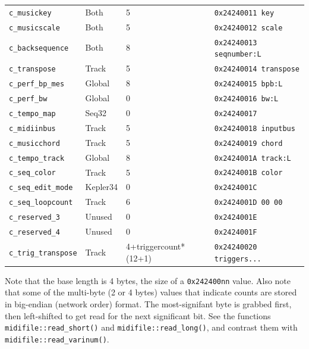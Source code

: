 \begin{table}[htb]
\begin{tabular}{l l l l}
         \texttt{c\_musickey}        & Both          & 5                 & \texttt{0x24240011 key} \\
         \texttt{c\_musicscale}      & Both          & 5                 & \texttt{0x24240012 scale} \\
         \texttt{c\_backsequence}    & Both          & 8                 & \texttt{0x24240013 seqnumber:L} \\
         \texttt{c\_transpose}       & Track         & 5                 & \texttt{0x24240014 transpose} \\
         \texttt{c\_perf\_bp\_mes}   & Global        & 8                 & \texttt{0x24240015 bpb:L} \\
         \texttt{c\_perf\_bw}        & Global        & 0                 & \texttt{0x24240016 bw:L} \\
         \texttt{c\_tempo\_map}      & Seq32         & 0                 & \texttt{0x24240017} \\
         \texttt{c\_midiinbus}       & Track         & 5                 & \texttt{0x24240018 inputbus} \\
         \texttt{c\_musicchord}      & Track         & 5                 & \texttt{0x24240019 chord} \\
         \texttt{c\_tempo\_track}    & Global        & 8                 & \texttt{0x2424001A track:L} \\
         \texttt{c\_seq\_color}      & Track         & 5                 & \texttt{0x2424001B color} \\
         \texttt{c\_seq\_edit\_mode} & Kepler34      & 0                 & \texttt{0x2424001C} \\
         \texttt{c\_seq\_loopcount}  & Track         & 6                 & \texttt{0x2424001D 00 00} \\
         \texttt{c\_reserved\_3}     & Unused        & 0                 & \texttt{0x2424001E} \\
         \texttt{c\_reserved\_4}     & Unused        & 0                 & \texttt{0x2424001F} \\
         \texttt{c\_trig\_transpose} & Track     & 4+triggercount*(12+1) & \texttt{0x24240020 triggers...} \\
      \end{tabular}
   \end{table}

   Note that the base length is 4 bytes, the size of a \texttt{0x242400nn}
   value.  Also note that some of the multi-byte (2 or 4 bytes) values that
   indicate counts are stored in big-endian (network order) format.  The
   most-signifant byte is grabbed first, then
   left-shifted to get read for the next significant bit.
   See the functions
   \texttt{midifile::read\_short()} and
   \texttt{midifile::read\_long()}, and contrast them with
   \texttt{midifile::read\_varinum()}.

